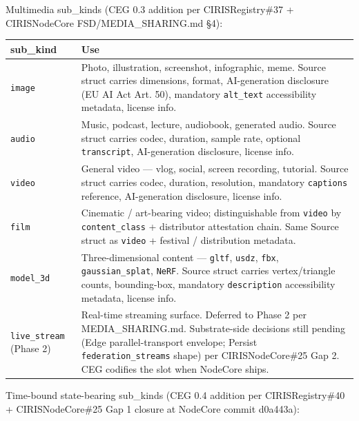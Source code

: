 \documentclass[11pt]{article}
\begin{document}
Multimedia sub\_kinds (CEG 0.3 addition per CIRISRegistry\#37 + CIRISNodeCore FSD/MEDIA\_SHARING.md §4):


{\footnotesize
\begin{longtable}{|p{8.0cm}|p{8.0cm}|}\hline
\textbf{sub\_kind} & \textbf{Use} \\ \hline\endhead
\texttt{image} & Photo, illustration, screenshot, infographic, meme. Source struct carries dimensions, format, AI-generation disclosure (EU AI Act Art. 50), mandatory \texttt{alt\_text} accessibility metadata, license info. \\ \hline
\texttt{audio} & Music, podcast, lecture, audiobook, generated audio. Source struct carries codec, duration, sample rate, optional \texttt{transcript}, AI-generation disclosure, license info. \\ \hline
\texttt{video} & General video — vlog, social, screen recording, tutorial. Source struct carries codec, duration, resolution, mandatory \texttt{captions} reference, AI-generation disclosure, license info. \\ \hline
\texttt{film} & Cinematic / art-bearing video; distinguishable from \texttt{video} by \texttt{content\_class} + distributor attestation chain. Same Source struct as \texttt{video} + festival / distribution metadata. \\ \hline
\texttt{model\_3d} & Three-dimensional content — \texttt{gltf}, \texttt{usdz}, \texttt{fbx}, \texttt{gaussian\_splat}, \texttt{NeRF}. Source struct carries vertex/triangle counts, bounding-box, mandatory \texttt{description} accessibility metadata, license info. \\ \hline
\texttt{live\_stream} (Phase 2) & Real-time streaming surface. Deferred to Phase 2 per MEDIA\_SHARING.md. Substrate-side decisions still pending (Edge parallel-transport envelope; Persist \texttt{federation\_streams} shape) per CIRISNodeCore\#25 Gap 2. CEG codifies the slot when NodeCore ships. \\ \hline
\end{longtable}}


Time-bound state-bearing sub\_kinds (CEG 0.4 addition per CIRISRegistry\#40 + CIRISNodeCore\#25 Gap 1 closure at NodeCore commit d0a443a):
\end{document}
